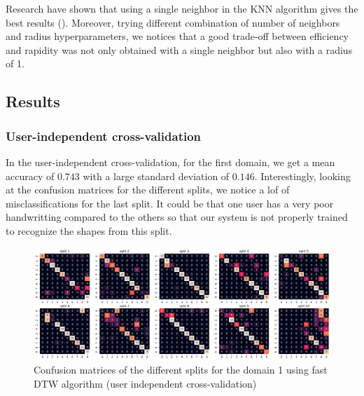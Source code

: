 Research have shown that using a single neighbor in the KNN algorithm gives the best results (\cite{Mitsa_2010}). Moreover, trying different combination of number of neighbors and radius hyperparameters, we notices that a good trade-off between efficiency and rapidity was not only obtained with a single neighbor but also with a radius of 1.



\subsection{Results}

\subsubsection{User-independent cross-validation}

In the user-independent cross-validation, for the first domain, we get a mean accuracy of $0.743$ with a large standard deviation of $0.146$. Interestingly, looking at the confusion matrices for the different splits, we notice a lof of misclassifications for the last split. It could be that one user has a very poor handwritting compared to the others so that our system is not properly trained to recognize the shapes from this split.

\begin{figure}[H]
	\centering
	\includegraphics{figures/dtw/domain01/cm_dtw_d1_uindep.png}
	\caption{Confusion matrices of the different splits for the domain 1 using fast DTW algorithm (user independent cross-validation)}
	\label{fig:cm-dtw-d1-uindep}
\end{figure}

